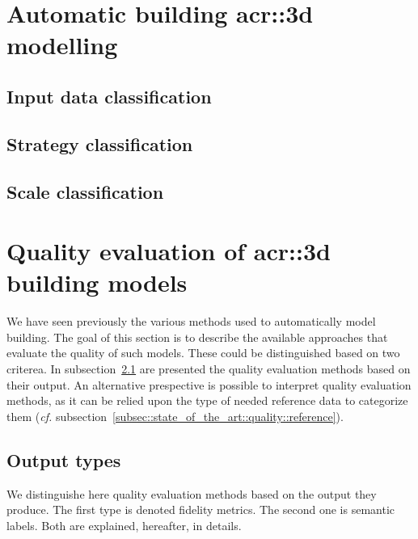 \minitoc

\vfill

\clearpage

\section{Automatic building \gls*{acr::3d} modelling}
    \label{sec::state_of_the_art::building_modeling}

    \subsection{Input data classification}
        \label{subsec::state_of_the_art::building_modeling::input}

    \subsection{Strategy classification}
        \label{subsec::state_of_the_art::building_modeling::strategy}

    \subsection{Scale classification}
        \label{subsec::state_of_the_art::building_modeling::scale}

\section{Quality evaluation of \gls*{acr::3d} building models}
    \label{sec::state_of_the_art::quality}
    We have seen previously the various methods used to automatically model building.
    The goal of this section is to describe the available approaches that evaluate the quality of such models.
    These could be distinguished based on two criterea.
    In subsection~\ref{subsec::state_of_the_art::quality::output} are presented the quality evaluation methods based on their output.
    An alternative prespective is possible to interpret quality evaluation methods, as it can be relied upon the type of needed reference data to categorize them (\textit{cf.} subsection~\ref{subsec::state_of_the_art::quality::reference}).

    \subsection{Output types}
        \label{subsec::state_of_the_art::quality::output}
        We distinguishe here quality evaluation methods based on the output they produce.
        The first type is denoted fidelity metrics.
        The second one is semantic labels.
        Both are explained, hereafter, in details.

